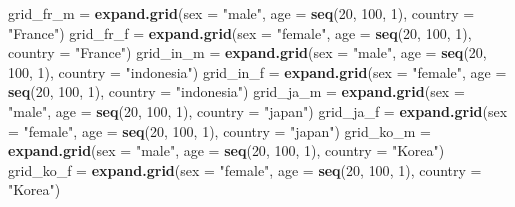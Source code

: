 \documentclass[
]{article}
\newenvironment{Shaded}{\begin{snugshade}}{\end{snugshade}}
\newcommand{\DataTypeTok}[1]{\textcolor[rgb]{0.13,0.29,0.53}{#1}}
\newcommand{\DecValTok}[1]{\textcolor[rgb]{0.00,0.00,0.81}{#1}}
\newcommand{\KeywordTok}[1]{\textcolor[rgb]{0.13,0.29,0.53}{\textbf{#1}}}
\newcommand{\NormalTok}[1]{#1}
\newcommand{\StringTok}[1]{\textcolor[rgb]{0.31,0.60,0.02}{#1}}
\begin{document}
\begin{Shaded}
\begin{Highlighting}[]
\NormalTok{grid_fr_m =}\StringTok{ }\KeywordTok{expand.grid}\NormalTok{(}\DataTypeTok{sex =} \StringTok{"male"}\NormalTok{, }\DataTypeTok{age =} \KeywordTok{seq}\NormalTok{(}\DecValTok{20}\NormalTok{, }\DecValTok{100}\NormalTok{, }\DecValTok{1}\NormalTok{), }\DataTypeTok{country =} \StringTok{"France"}\NormalTok{)}
\NormalTok{grid_fr_f =}\StringTok{ }\KeywordTok{expand.grid}\NormalTok{(}\DataTypeTok{sex =} \StringTok{"female"}\NormalTok{, }\DataTypeTok{age =} \KeywordTok{seq}\NormalTok{(}\DecValTok{20}\NormalTok{, }\DecValTok{100}\NormalTok{, }\DecValTok{1}\NormalTok{), }\DataTypeTok{country =} \StringTok{"France"}\NormalTok{)}
\NormalTok{grid_in_m =}\StringTok{ }\KeywordTok{expand.grid}\NormalTok{(}\DataTypeTok{sex =} \StringTok{"male"}\NormalTok{, }\DataTypeTok{age =} \KeywordTok{seq}\NormalTok{(}\DecValTok{20}\NormalTok{, }\DecValTok{100}\NormalTok{, }\DecValTok{1}\NormalTok{), }\DataTypeTok{country =} \StringTok{"indonesia"}\NormalTok{)}
\NormalTok{grid_in_f =}\StringTok{ }\KeywordTok{expand.grid}\NormalTok{(}\DataTypeTok{sex =} \StringTok{"female"}\NormalTok{, }\DataTypeTok{age =} \KeywordTok{seq}\NormalTok{(}\DecValTok{20}\NormalTok{, }\DecValTok{100}\NormalTok{, }\DecValTok{1}\NormalTok{), }\DataTypeTok{country =} \StringTok{"indonesia"}\NormalTok{)}
\NormalTok{grid_ja_m =}\StringTok{ }\KeywordTok{expand.grid}\NormalTok{(}\DataTypeTok{sex =} \StringTok{"male"}\NormalTok{, }\DataTypeTok{age =} \KeywordTok{seq}\NormalTok{(}\DecValTok{20}\NormalTok{, }\DecValTok{100}\NormalTok{, }\DecValTok{1}\NormalTok{), }\DataTypeTok{country =} \StringTok{"japan"}\NormalTok{)}
\NormalTok{grid_ja_f =}\StringTok{ }\KeywordTok{expand.grid}\NormalTok{(}\DataTypeTok{sex =} \StringTok{"female"}\NormalTok{, }\DataTypeTok{age =} \KeywordTok{seq}\NormalTok{(}\DecValTok{20}\NormalTok{, }\DecValTok{100}\NormalTok{, }\DecValTok{1}\NormalTok{), }\DataTypeTok{country =} \StringTok{"japan"}\NormalTok{)}
\NormalTok{grid_ko_m =}\StringTok{ }\KeywordTok{expand.grid}\NormalTok{(}\DataTypeTok{sex =} \StringTok{"male"}\NormalTok{, }\DataTypeTok{age =} \KeywordTok{seq}\NormalTok{(}\DecValTok{20}\NormalTok{, }\DecValTok{100}\NormalTok{, }\DecValTok{1}\NormalTok{), }\DataTypeTok{country =} \StringTok{"Korea"}\NormalTok{)}
\NormalTok{grid_ko_f =}\StringTok{ }\KeywordTok{expand.grid}\NormalTok{(}\DataTypeTok{sex =} \StringTok{"female"}\NormalTok{, }\DataTypeTok{age =} \KeywordTok{seq}\NormalTok{(}\DecValTok{20}\NormalTok{, }\DecValTok{100}\NormalTok{, }\DecValTok{1}\NormalTok{), }\DataTypeTok{country =} \StringTok{"Korea"}\NormalTok{)}


\end{Highlighting}
\end{Shaded}
\end{document}
